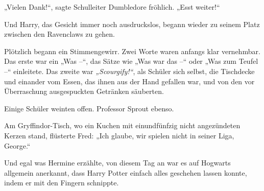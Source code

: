 „Vielen Dank!“, sagte Schulleiter Dumbledore fröhlich. „Esst weiter!“ 

Und Harry, das Gesicht immer noch ausdruckslos, begann wieder zu seinem Platz zwischen den Ravenclaws zu gehen. 

Plötzlich begann ein Stimmengewirr. Zwei Worte waren anfangs klar vernehmbar. Das erste war ein „Was –“, das Sätze wie „Was war das –“ oder „Was zum Teufel –“ einleitete. Das zweite war \emph{„Scourgify!“}, als Schüler sich selbst, die Tischdecke und einander vom Essen, das ihnen aus der Hand gefallen war, und von den vor Überraschung ausgespuckten Getränken säuberten. 

Einige Schüler weinten offen. Professor Sprout ebenso. 

Am Gryffindor-Tisch, wo ein Kuchen mit einundfünfzig nicht angezündeten Kerzen stand, flüsterte Fred: „Ich glaube, wir spielen nicht in seiner Liga, George.“ 

Und egal was Hermine erzählte, von diesem Tag an war es auf Hogwarts allgemein anerkannt, dass Harry Potter einfach alles geschehen lassen konnte, indem er mit den Fingern schnippte.
